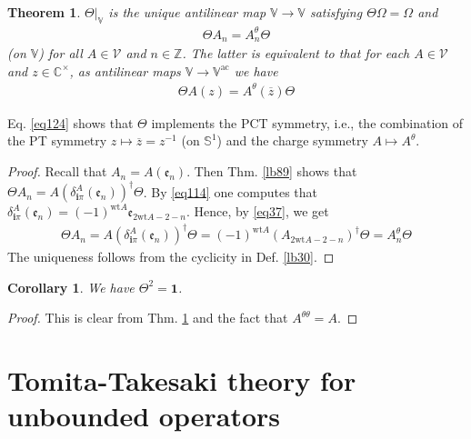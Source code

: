 \documentclass[12pt,b5paper,notitlepage]{article}
\theoremstyle{definition}
\theoremstyle{plain}
\newtheorem{thm}[df]{Theorem}
\newtheorem{co}[df]{Corollary}
\newcommand{\ovl}{\overline}
\newcommand{\idt}{\mathbf{1}}
\newcommand{\im}{\mathbf{i}}
\newcommand{\Vbb}{\mathbb V}
\newcommand{\Cbb}{\mathbb C}
\newcommand{\Zbb}{\mathbb Z}
\newcommand{\wt}{\mathrm{wt}}
\newcommand{\Sbb}{{\mathbb S}}
\newcommand{\ek}{\mathfrak{e}}
\newcommand{\ac}{\mathrm{ac}}
\newcommand{\MV}{\mathcal V}
\numberwithin{equation}{section}
\begin{document}
\subsection{}


\begin{thm}\label{lb90}
$\Theta|_\Vbb$ is the unique antilinear map $\Vbb\rightarrow\Vbb$ satisfying $\Theta\Omega=\Omega$ and
\begin{align}
\Theta A_n=A^\theta_n\Theta
\end{align}
(on $\Vbb$) for all $A\in\MV$ and $n\in\Zbb$. The latter is equivalent to that for each $A\in\MV$ and $z\in\Cbb^\times$, as antilinear maps $\Vbb\rightarrow\Vbb^\ac$ we have
\begin{align}\label{eq124}
\Theta A(z)=A^\theta(\ovl z)\Theta
\end{align}
\end{thm}

Eq. \eqref{eq124} shows that $\Theta$ implements the PCT symmetry, i.e., the combination of the PT symmetry $z\mapsto \ovl z=z^{-1}$ (on $\Sbb^1$) and the charge symmetry $A\mapsto A^\theta$.



\begin{proof}
Recall that $A_n=A(\ek_n)$. Then Thm. \ref{lb89} shows that $\Theta A_n=A(\delta^A_{\im\pi}(\ek_n))^\dagger\Theta$. By \eqref{eq114} one computes that $\delta^A_{\im\pi}(\ek_n)=(-1)^{\wt A}\ek_{2\wt A-2-n}$. Hence, by \eqref{eq37}, we get
\begin{align*}
\Theta A_n=A(\delta^A_{\im\pi}(\ek_n))^\dagger\Theta=(-1)^{\wt A}(A_{2\wt A-2-n})^\dagger\Theta=A^\theta_n\Theta
\end{align*}
The uniqueness follows from the cyclicity in Def. \ref{lb30}.
\end{proof}



\begin{co}
We have $\Theta^2=\idt$.
\end{co}

\begin{proof}
This is clear from Thm. \ref{lb90} and the fact that $A^{\theta\theta}=A$.
\end{proof}



\newpage



\section{Tomita-Takesaki theory for unbounded operators}
\end{document}
